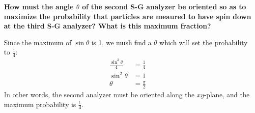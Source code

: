 \documentclass[11pt]{article}
\begin{document}
\begin{enumerate}[label=\textbf{\arabic*.}, start=3]
{\begin{enumerate}[label=\textbf{(\alph*)}]
{                    \textbf{\boldmath How must the angle \(\theta\) of the second S-G analyzer be oriented so as to maximize the probability that particles are meaured to have spin down at the third S-G analyzer? What is this maximum fraction?}
                    \par
                    Since the maximum of \(\sin\theta\) is 1, we mush find a \(\theta\) which will set the probability to \(\frac 1 4\):
                    \begin{align*}
                        \frac{\sin^2\theta}{4}&=\frac 1 4 \\
                        \sin^2\theta&=1 \\
                        \theta&=\frac \pi 2
                    \end{align*}
                    In other words, the second analyzer must be oriented along the \(xy\)-plane, and the maximum probability is \(\frac 1 4\).
                }
            \end{enumerate}
        }
    \end{enumerate}
\end{document}
